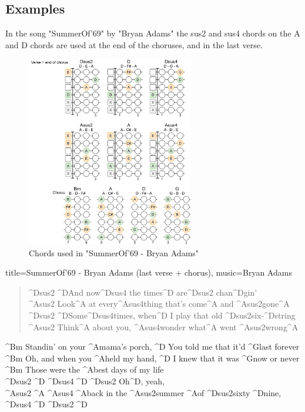 \newpage

\subsection{Examples}

In the song "SummerOf'69" by "Bryan Adams" the sus2 and sus4 chords on the A and D chords are used at the end of the choruses, and in the last verse.

\begin{figure}[h]
	\centering
	\includegraphics[width=0.65\textwidth]{../../Images/ChordsInSummerOf69BryanAdams.png}
	\caption{Chords used in "SummerOf'69 - Bryan Adams"}
	\label{fig:guitar_chords_summer_of_69_bryan_adams}
\end{figure}

\begin{song}[align-chords=l]{title={SummerOf'69 - Bryan Adams (last verse + chorus)}, music={Bryan Adams}}
	\begin{verse}
		^{Dsus2} ^{D}And now^{Dsus4} the times^{D} are^{Dsus2} chan^{D}gin' {} \\
		^{Asus2} Look^{A} at every^{Asus4}thing that's come^{A} and ^{Asus2}gone^{A} {} \\
		^{Dsus2} ^{D}Some^{Dsus4}times, when^{D} I play that old ^{Dsus2}six-^{D}string {} \\
		^{Asus2} Think^{A} about you, ^{Asus4}wonder what^{A} went ^{Asus2}wrong^{A} \\
	\end{verse}
	\begin{chorus}
		^{Bm} Standin' on your ^{A}mama's porch, ^{D} You told me that it'd ^{G}last forever \\
		^{Bm} Oh, and when you ^{A}held my hand, ^{D} I knew that it was ^{G}now or never \\
		^{Bm} Those were the ^{A}best days of my life \\
		^{Dsus2} ^{D} ^{Dsus4} ^{D} ^{Dsus2} Oh^{D}, yeah, \\
		^{Asus2} ^{A} ^{Asus4} ^{A}back in the ^{Asus2}summer ^{A}of ^{Dsus2}sixty ^{D}nine, ^{Dsus4} ^{D} ^{Dsus2} ^{D} \\
	\end{chorus}
\end{song}

